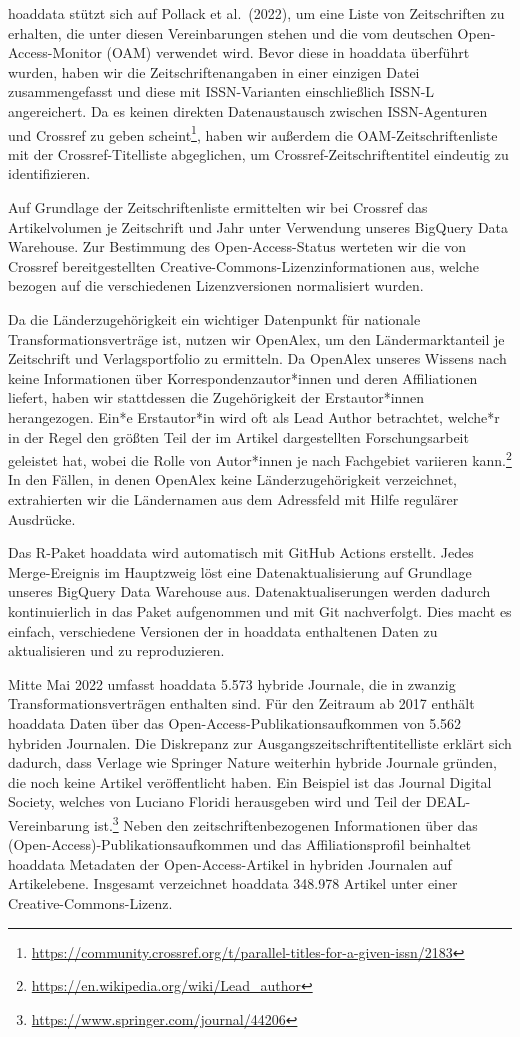 \documentclass[a4paper,
fontsize=11pt,
oneside,
numbers=noperiodatend,
parskip=half-,
bibliography=totoc,
final
]{scrartcl}
\begin{document}
hoaddata stützt sich auf Pollack et al.~(2022), um eine Liste von
Zeitschriften zu erhalten, die unter diesen Vereinbarungen stehen und
die vom deutschen Open-Access-Monitor (OAM) verwendet wird. Bevor diese
in hoaddata überführt wurden, haben wir die Zeitschriftenangaben in
einer einzigen Datei zusammengefasst und diese mit ISSN-Varianten
einschließlich ISSN-L angereichert. Da es keinen direkten Datenaustausch
zwischen ISSN-Agenturen und Crossref zu geben scheint\footnote{\url{https://community.crossref.org/t/parallel-titles-for-a-given-issn/2183}},
haben wir außerdem die OAM-Zeitschriftenliste mit der
Crossref-Titelliste abgeglichen, um Crossref-Zeitschriftentitel
eindeutig zu identifizieren.

Auf Grundlage der Zeitschriftenliste ermittelten wir bei Crossref das
Artikelvolumen je Zeitschrift und Jahr unter Verwendung unseres BigQuery
Data Warehouse. Zur Bestimmung des Open-Access-Status werteten wir die
von Crossref bereitgestellten Creative-Commons-Lizenz\-info\-rmationen aus,
welche bezogen auf die verschiedenen Lizenzversionen normalisiert
wurden.

Da die Länderzugehörigkeit ein wichtiger Datenpunkt für nationale
Transformationsverträge ist, nutzen wir OpenAlex, um den
Ländermarktanteil je Zeitschrift und Verlagsportfolio zu ermitteln. Da
OpenAlex unseres Wissens nach keine Informationen über
Korrespondenzautor*innen und deren Affiliationen liefert, haben wir
stattdessen die Zugehörigkeit der Erstautor*innen herangezogen. Ein*e
Erstautor*in wird oft als Lead Author betrachtet, welche*r in der Regel
den größten Teil der im Artikel dargestellten Forschungsarbeit geleistet
hat, wobei die Rolle von Autor*innen je nach Fachgebiet variieren
kann.\footnote{\url{https://en.wikipedia.org/wiki/Lead_author}} In den
Fällen, in denen OpenAlex keine Länderzugehörigkeit verzeichnet,
extrahierten wir die Ländernamen aus dem Adressfeld mit Hilfe regulärer
Ausdrücke.

Das R-Paket hoaddata wird automatisch mit GitHub Actions erstellt. Jedes
Merge-Ereignis im Hauptzweig löst eine Datenaktualisierung auf Grundlage
unseres BigQuery Data Warehouse aus. Datenaktualiserungen werden dadurch
kontinuierlich in das Paket aufgenommen und mit Git nachverfolgt. Dies
macht es einfach, verschiedene Versionen der in hoaddata enthaltenen
Daten zu aktualisieren und zu reproduzieren.

Mitte Mai 2022 umfasst hoaddata 5.573 hybride Journale, die in zwanzig
Transformationsverträgen enthalten sind. Für den Zeitraum ab 2017
enthält hoaddata Daten über das Open-Access-Publikationsaufkommen von
5.562 hybriden Journalen. Die Diskrepanz zur
Ausgangszeitschriftentitelliste erklärt sich dadurch, dass Verlage wie
Springer Nature weiterhin hybride Journale gründen, die noch keine
Artikel veröffentlicht haben. Ein Beispiel ist das Journal Digital
Society, welches von Luciano Floridi herausgeben wird und Teil der
DEAL-Vereinbarung ist.\footnote{\url{https://www.springer.com/journal/44206}}
Neben den zeitschriftenbezogenen Informationen über das
(Open-Access)-Publikationsaufkommen und das Affiliationsprofil
beinhaltet hoaddata Metadaten der Open-Access-Artikel in hybriden
Journalen auf Artikelebene. Insgesamt verzeichnet hoaddata 348.978
Artikel unter einer Creative-Com\-mons-Lizenz.
\end{document}

